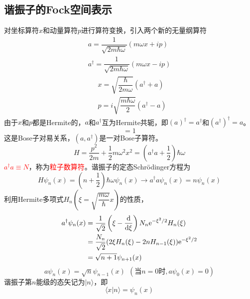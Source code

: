 \documentclass[11pt,a4paper]{article}
\newcommand{\dif}{\mathrm{d}}
\begin{document}
\subsection{谐振子的Fock空间表示}
对坐标算符$x$和动量算符$p$进行算符变换，引入两个新的无量纲算符
\begin{align}
a = \dfrac{1}{\sqrt{2m\hbar \omega}} (m\omega x +ip) \\
a^\dagger = \dfrac{1}{\sqrt{2m\hbar \omega}} (m\omega x -ip) 
\end{align}
\begin{align}
& x  = \sqrt{\dfrac{\hbar}{2m\omega}} (a^\dagger +a) \\
& p  = i\sqrt{\dfrac{m \hbar \omega}{2}} (a^\dagger -a)
\end{align}
由于$x$和$p$都是Hermite的，$a$和$a^\dagger$互为Hermite共轭，即$(a)^\dagger = a^\dagger$和$(a^\dagger)^\dagger = a$。
\begin{equation}
[a, a^\dagger] = 1
\end{equation}
这是Bose子对易关系，$(a, a^\dagger)$是一对Bose子算符。
\begin{equation}
H = \dfrac{p^2}{2m} +\dfrac{1}{2}m\omega^2 x^2 = \left(a^\dagger a +\dfrac{1}{2} \right) \hbar \omega
\end{equation}
\textcolor{red}{$a^\dagger a \equiv N$}，称为\textcolor{red}{粒子数算符}。谐振子的定态Schr\"odinger方程为
\begin{equation}
H\psi_n(x) = \left( n +\dfrac{1}{2}\right) \hbar \omega \psi_n(x) \rightarrow a^\dagger a \psi_n(x) = n \psi_n(x)
\end{equation}
利用Hermite多项式$H_n\left(\xi = \sqrt{\dfrac{m\omega}{\hbar}} x \right)$的性质，
\begin{align}
\nonumber a^\dagger \psi_n(x) &= \dfrac{1}{\sqrt{2}} \left(\xi -\dfrac{\dif}{\dif \xi} \right) N_n {\rm e}^{-\xi^2/2} H_n(\xi) \\
\nonumber &= \dfrac{N_n}{\sqrt{2}} (2\xi H_n(\xi) -2nH_{n-1}(\xi)) {\rm e}^{-\xi^2/2} \\
&= \sqrt{n+1} \psi_{n+1}(x)
\end{align}
\begin{equation}
a \psi_{n}(x) = \sqrt{n} \psi_{n-1}(x) ~~ (\text{当} n = 0 \text{时}, a \psi_{0}(x) = 0)
\end{equation}
谐振子第$n$能级的态矢记为$|n\rangle$，即
\begin{equation*}
\langle x | n\rangle = \psi_n(x)
\end{equation*}
\end{document}
